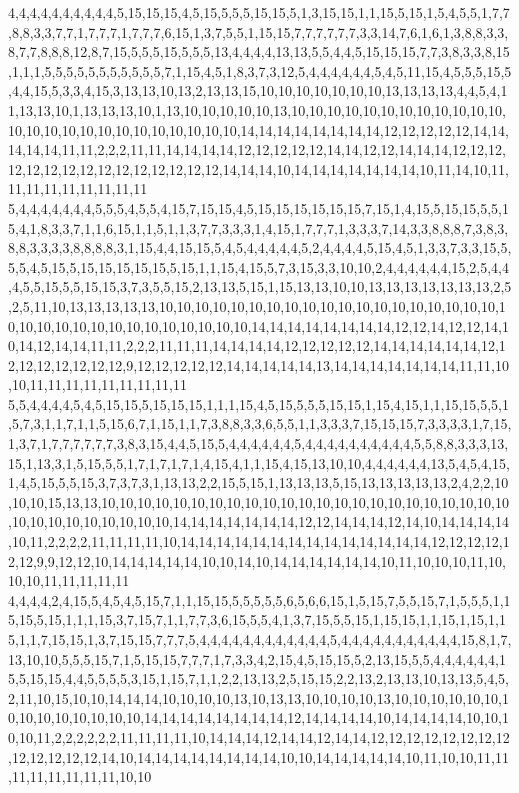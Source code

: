 4,4,4,4,4,4,4,4,4,4,5,15,15,15,4,5,15,5,5,5,15,15,5,1,3,15,15,1,1,15,5,15,1,5,4,5,5,1,7,7,8,8,3,3,7,7,1,7,7,7,1,7,7,7,6,15,1,3,7,5,5,1,15,15,7,7,7,7,7,7,3,3,14,7,6,1,6,1,3,8,8,3,3,8,7,7,8,8,8,12,8,7,15,5,5,5,15,5,5,5,13,4,4,4,4,13,13,5,5,4,4,5,15,15,15,7,7,3,8,3,3,8,15,1,1,1,5,5,5,5,5,5,5,5,5,5,5,7,1,15,4,5,1,8,3,7,3,12,5,4,4,4,4,4,4,5,4,5,11,15,4,5,5,5,15,5,4,4,15,5,3,3,4,15,3,13,13,10,13,2,13,13,15,10,10,10,10,10,10,10,13,13,13,13,4,4,5,4,11,13,13,10,1,13,13,13,10,1,13,10,10,10,10,10,13,10,10,10,10,10,10,10,10,10,10,10,10,10,10,10,10,10,10,10,10,10,10,10,10,10,14,14,14,14,14,14,14,14,12,12,12,12,12,14,14,14,14,14,11,11,2,2,2,11,11,14,14,14,14,12,12,12,12,12,14,14,12,12,14,14,14,12,12,12,12,12,12,12,12,12,12,12,12,12,12,12,14,14,14,10,14,14,14,14,14,14,14,10,11,14,10,11,11,11,11,11,11,11,11,11
5,4,4,4,4,4,4,4,5,5,5,4,5,5,4,15,7,15,15,4,5,15,15,15,15,15,15,7,15,1,4,15,5,15,15,5,5,15,4,1,8,3,3,7,1,1,6,15,1,1,5,1,1,3,7,7,3,3,3,1,4,15,1,7,7,7,1,3,3,3,7,14,3,3,8,8,8,7,3,8,3,8,8,3,3,3,3,8,8,8,8,3,1,15,4,4,15,15,5,4,5,4,4,4,4,4,5,2,4,4,4,4,5,15,4,5,1,3,3,7,3,3,15,5,5,5,4,5,15,5,15,15,15,15,15,5,15,1,1,15,4,15,5,7,3,15,3,3,10,10,2,4,4,4,4,4,4,15,2,5,4,4,4,5,5,15,5,5,15,15,3,7,3,5,5,15,2,13,13,5,15,1,15,13,13,10,10,13,13,13,13,13,13,13,2,5,2,5,11,10,13,13,13,13,13,10,10,10,10,10,10,10,10,10,10,10,10,10,10,10,10,10,10,10,10,10,10,10,10,10,10,10,10,10,10,10,10,10,14,14,14,14,14,14,14,14,12,12,14,12,12,14,10,14,12,14,14,11,11,2,2,2,11,11,11,14,14,14,14,12,12,12,12,12,14,14,14,14,14,14,12,12,12,12,12,12,12,12,9,12,12,12,12,12,14,14,14,14,14,13,14,14,14,14,14,14,14,11,11,10,10,11,11,11,11,11,11,11,11,11
5,5,4,4,4,4,5,4,5,15,15,5,15,15,15,1,1,1,15,4,5,15,5,5,5,15,15,1,15,4,15,1,1,15,15,5,5,1,5,7,3,1,1,7,1,1,5,15,6,7,1,15,1,1,7,3,8,8,3,3,6,5,5,1,1,3,3,3,7,15,15,15,7,3,3,3,3,1,7,15,1,3,7,1,7,7,7,7,7,7,3,8,3,15,4,4,5,15,5,4,4,4,4,4,4,5,4,4,4,4,4,4,4,4,4,4,5,5,8,8,3,3,3,13,15,1,13,3,1,5,15,5,5,1,7,1,7,1,7,1,4,15,4,1,1,15,4,15,13,10,10,4,4,4,4,4,4,13,5,4,5,4,15,1,4,5,15,5,5,15,3,7,3,7,3,1,13,13,2,2,15,5,15,1,13,13,13,5,15,13,13,13,13,13,2,4,2,2,10,10,10,15,13,13,10,10,10,10,10,10,10,10,10,10,10,10,10,10,10,10,10,10,10,10,10,10,10,10,10,10,10,10,10,10,10,10,14,14,14,14,14,14,14,12,12,14,14,14,12,14,10,14,14,14,14,10,11,2,2,2,2,11,11,11,11,10,14,14,14,14,14,14,14,14,14,14,14,14,14,14,12,12,12,12,12,12,9,9,12,12,10,14,14,14,14,14,10,10,14,10,14,14,14,14,14,14,10,11,10,10,10,11,10,10,10,11,11,11,11,11
4,4,4,4,2,4,15,5,4,5,4,5,15,7,1,1,15,15,5,5,5,5,5,6,5,6,6,15,1,5,15,7,5,5,15,7,1,5,5,5,1,15,15,5,15,1,1,1,15,3,7,15,7,1,1,7,7,3,6,15,5,5,4,1,3,7,15,5,5,15,1,15,15,1,1,15,1,15,1,15,1,1,7,15,15,1,3,7,15,15,7,7,7,5,4,4,4,4,4,4,4,4,4,4,4,4,5,4,4,4,4,4,4,4,4,4,4,4,15,8,1,7,13,10,10,5,5,5,15,7,1,5,15,15,7,7,7,1,7,3,3,4,2,15,4,5,15,15,5,2,13,15,5,5,4,4,4,4,4,4,15,5,15,15,4,4,5,5,5,5,3,15,1,15,7,1,1,2,2,13,13,2,5,15,15,2,2,13,2,13,13,10,13,13,5,4,5,2,11,10,15,10,10,14,14,14,10,10,10,10,13,10,13,13,10,10,10,10,13,10,10,10,10,10,10,10,10,10,10,10,10,10,10,14,14,14,14,14,14,14,14,12,14,14,14,14,10,14,14,14,14,10,10,10,10,11,2,2,2,2,2,2,11,11,11,11,10,14,14,14,12,14,14,12,14,14,12,12,12,12,12,12,12,12,12,12,12,12,12,14,10,14,14,14,14,14,14,14,14,10,10,14,14,14,14,14,10,11,10,10,11,11,11,11,11,11,11,11,10,10
